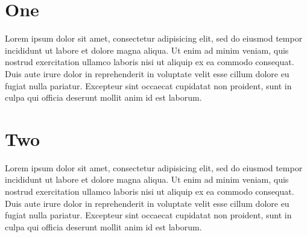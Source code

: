 \documentclass[a4paper, 12pt]{article}
\begin{document}
\section{One}
Lorem ipsum dolor sit amet, consectetur adipisicing elit, sed do eiusmod tempor incididunt ut labore et dolore magna aliqua. Ut enim ad minim veniam, quis nostrud exercitation ullamco laboris nisi ut aliquip ex ea commodo consequat. Duis aute irure dolor in reprehenderit in voluptate velit esse cillum dolore eu fugiat nulla pariatur. Excepteur sint occaecat cupidatat non proident, sunt in culpa qui officia deserunt mollit anim id est laborum.

\section{Two}
Lorem ipsum dolor sit amet, consectetur adipisicing elit, sed do eiusmod tempor incididunt ut labore et dolore magna aliqua. Ut enim ad minim veniam, quis nostrud exercitation ullamco laboris nisi ut aliquip ex ea commodo consequat. Duis aute irure dolor in reprehenderit in voluptate velit esse cillum dolore eu fugiat nulla pariatur. Excepteur sint occaecat cupidatat non proident, sunt in culpa qui officia deserunt mollit anim id est laborum.
\end{document}
